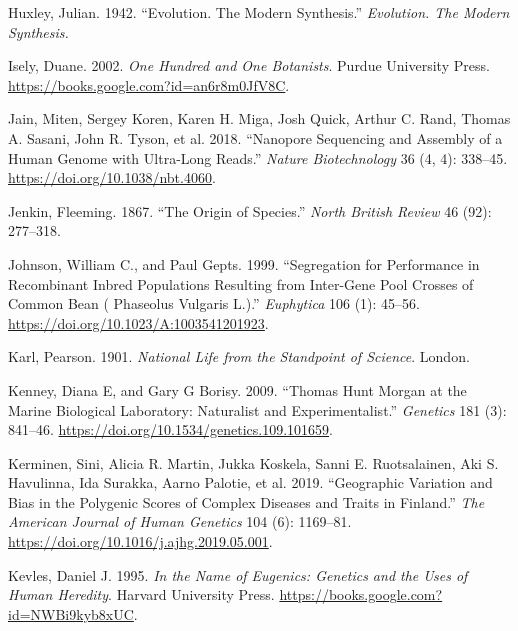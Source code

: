 \documentclass[
]{book}
\newlength{\cslhangindent}
\newlength{\cslentryspacingunit} %
\newenvironment{CSLReferences}[2] %
 {%
  \setlength{\parindent}{0pt}
  \ifodd #1
  \let\oldpar\par
  \def\par{\hangindent=\cslhangindent\oldpar}
  \fi
  \setlength{\parskip}{#2\cslentryspacingunit}
 }%
 {}
\begin{document}
\begin{CSLReferences}{1}{0}
\leavevmode{}%
Huxley, Julian. 1942. {``Evolution. {The} Modern Synthesis.''} \emph{Evolution. The Modern Synthesis.}

\leavevmode{}%
Isely, Duane. 2002. \emph{One {Hundred} and {One Botanists}}. {Purdue University Press}. \url{https://books.google.com?id=an6r8m0JfV8C}.

\leavevmode{}%
Jain, Miten, Sergey Koren, Karen H. Miga, Josh Quick, Arthur C. Rand, Thomas A. Sasani, John R. Tyson, et al. 2018. {``Nanopore Sequencing and Assembly of a Human Genome with Ultra-Long Reads.''} \emph{Nature Biotechnology} 36 (4, 4): 338--45. \url{https://doi.org/10.1038/nbt.4060}.

\leavevmode{}%
Jenkin, Fleeming. 1867. {``The Origin of Species.''} \emph{North British Review} 46 (92): 277--318.

\leavevmode{}%
Johnson, William C., and Paul Gepts. 1999. {``Segregation for Performance in Recombinant Inbred Populations Resulting from Inter-Gene Pool Crosses of Common Bean ( {Phaseolus} Vulgaris {L}.).''} \emph{Euphytica} 106 (1): 45--56. \url{https://doi.org/10.1023/A:1003541201923}.

\leavevmode{}%
Karl, Pearson. 1901. \emph{National {Life} from the Standpoint of {Science}}. {London}.

\leavevmode{}%
Kenney, Diana E, and Gary G Borisy. 2009. {``Thomas {Hunt Morgan} at the {Marine Biological Laboratory}: {Naturalist} and {Experimentalist}.''} \emph{Genetics} 181 (3): 841--46. \url{https://doi.org/10.1534/genetics.109.101659}.

\leavevmode{}%
Kerminen, Sini, Alicia R. Martin, Jukka Koskela, Sanni E. Ruotsalainen, Aki S. Havulinna, Ida Surakka, Aarno Palotie, et al. 2019. {``Geographic {Variation} and {Bias} in the {Polygenic Scores} of {Complex Diseases} and {Traits} in {Finland}.''} \emph{The American Journal of Human Genetics} 104 (6): 1169--81. \url{https://doi.org/10.1016/j.ajhg.2019.05.001}.

\leavevmode{}%
Kevles, Daniel J. 1995. \emph{In the {Name} of {Eugenics}: {Genetics} and the {Uses} of {Human Heredity}}. {Harvard University Press}. \url{https://books.google.com?id=NWBi9kyb8xUC}.


\end{CSLReferences}
\end{document}
